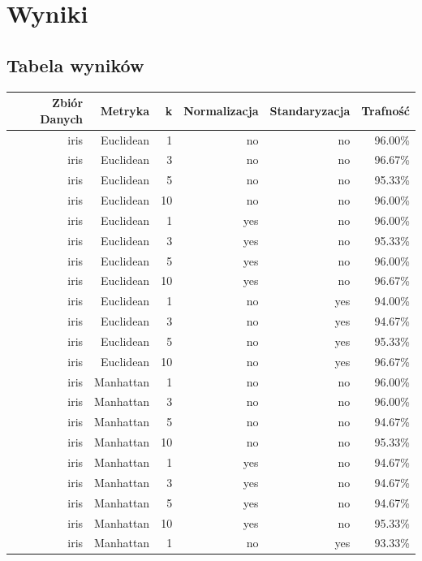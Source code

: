 \documentclass{classrep}
\begin{document}
\section{Wyniki}
\subsection{Tabela wyników}
\begin{center}
\begin{longtable}{|r|r|r|r|r|r|}
  \hline 
  Zbiór Danych & Metryka & k & Normalizacja & Standaryzacja & Trafność \\
	\hline
		iris & Euclidean & 1 & no & no & 96.00\% \\
	\hline
		iris & Euclidean & 3 & no & no & 96.67\% \\
	\hline
		iris & Euclidean & 5 & no & no & 95.33\% \\
	\hline
		iris & Euclidean & 10 & no & no & 96.00\% \\
	\hline
		iris & Euclidean & 1 & yes & no & 96.00\% \\
	\hline
		iris & Euclidean & 3 & yes & no & 95.33\% \\
	\hline
		iris & Euclidean & 5 & yes & no & 96.00\% \\
	\hline
		iris & Euclidean & 10 & yes & no & 96.67\% \\
	\hline
		iris & Euclidean & 1 & no & yes & 94.00\% \\
	\hline
		iris & Euclidean & 3 & no & yes & 94.67\% \\
	\hline
		iris & Euclidean & 5 & no & yes & 95.33\% \\
	\hline
		iris & Euclidean & 10 & no & yes & 96.67\% \\
	\hline
		iris & Manhattan & 1 & no & no & 96.00\% \\
	\hline
		iris & Manhattan & 3 & no & no & 96.00\% \\
	\hline
		iris & Manhattan & 5 & no & no & 94.67\% \\
	\hline
		iris & Manhattan & 10 & no & no & 95.33\% \\
	\hline
		iris & Manhattan & 1 & yes & no & 94.67\% \\
	\hline
		iris & Manhattan & 3 & yes & no & 94.67\% \\
	\hline
		iris & Manhattan & 5 & yes & no & 94.67\% \\
	\hline
		iris & Manhattan & 10 & yes & no & 95.33\% \\
	\hline
		iris & Manhattan & 1 & no & yes & 93.33\% \\

\end{longtable}
\end{center}
\end{document}
